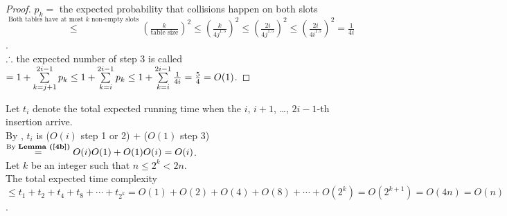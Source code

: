 \begin{pr}
\begin{lm}
\begin{proof}
$p_k=$ the expected probability that collisions happen on both slots $\overset{\text{Both tables have at most }k\text{ non-empty slots}}\leq(\frac k{\text{table size}})^2\leq(\frac k{4j^{1.5}})^2\leq(\frac{2i}{4j^{1.5}})^2\leq(\frac{2i}{4i^{1.5}})^2=\frac1{4i}$.\\
$\therefore$ the expected number of step 3 is called $=1+\sum\limits_{k=j+1}^{2i-1}p_k\leq1+\sum\limits_{k=i}^{2i-1}p_k\leq1+\sum\limits_{k=i}^{2i-1}\frac1{4i}=\frac54=O(1)$.
\end{proof}
\end{lm}
Let $t_i$ denote the total expected running time when the $i$, $i+1$, \dots, $2i-1$-th insertion arrive.\\
By , $t_i$ is ($O(i)$ step 1 or 2) $+$ ($O(1)$ step 3) $\overtext{By \rflm{4b}}=O(i)O(1)+O(1)O(i)=O(i)$.\\
Let $k$ be an integer such that $n\leq2^k<2n$.\\
The total expected time complexity $\leq t_1+t_2+t_4+t_8+\cdots+t_{2^k}=O(1)+O(2)+O(4)+O(8)+\cdots+O(2^k)=O(2^{k+1})=O(4n)=O(n)$.
\end{pr}
